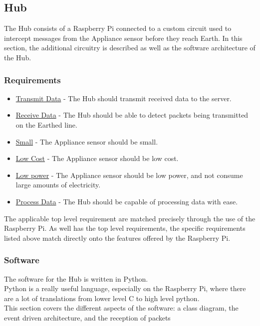 \documentclass[draft,preprint,12pt,3p]{elsarticle}
\begin{document}
\clearpage
\subsection{Hub}
The Hub consists of a Raspberry Pi connected to a custom circuit used to intercept messages from the Appliance sensor before they reach Earth. In this section, the additional circuitry is described as well as the software architecture of the Hub.
\subsubsection{Requirements}
\begin{itemize}
\item \underline{Transmit Data} - The Hub should transmit received data to the server.
\item \underline{Receive Data} - The Hub should be able to detect packets being transmitted on the Earthed line.
\item \underline{Small} - The Appliance sensor should be small.
\item \underline{Low Cost} - The Appliance sensor should be low cost.
\item \underline{Low power} - The Appliance sensor should be low power, and not consume large amounts of electricity.
\item \underline{Process Data} - The Hub should be capable of processing data with ease.
\end{itemize}
The applicable top level requirement are matched precisely through the use of the Raspberry Pi. As well has the top level requirements, the specific requirements listed above match directly onto the features offered by the Raspberry Pi.

\subsubsection{Software}
The software for the Hub is written in Python.\\
Python is a really useful language, especially on the Raspberry Pi, where there are a lot of translations from lower level C to high level python.\\
This section covers the different aspects of the software: a class diagram, the event driven architecture, and the reception of packets
\end{document}
